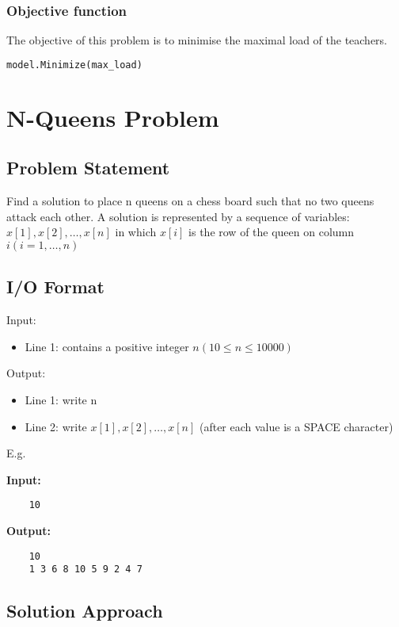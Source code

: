 \documentclass{article}
\begin{document}
\subsubsection{Objective function}
The objective of this problem is to minimise the maximal load of the teachers.
\begin{lstlisting}[language=Python]
model.Minimize(max_load)
\end{lstlisting}

\pagebreak

\section{N-Queens Problem}
\subsection{Problem Statement}
Find a solution to place n queens on a chess board such that no two queens attack each other.
A solution is represented by a sequence of variables: $x[1], x[2], \dots , x[n]$ in which $x[i]$
is the row of the queen on column $i (i = 1, \dots , n)$

\subsection{I/O Format}
Input:
\begin{itemize}
    \item Line 1: contains a positive integer $n(10 \le n \le 10000)$
\end{itemize}
Output:
\begin{itemize}
    \item Line 1: write n 
    \item Line 2: write $x[1], x[2],  \dots , x[n]$ (after each value is a SPACE character)
\end{itemize}
E.g.

\begin{multicols}{2}
\textbf{Input:}
\begin{verbatim}
    10
\end{verbatim}
\textbf{Output:}
\begin{verbatim}
    10
    1 3 6 8 10 5 9 2 4 7
\end{verbatim}
\end{multicols}

\subsection{Solution Approach}
\end{document}
